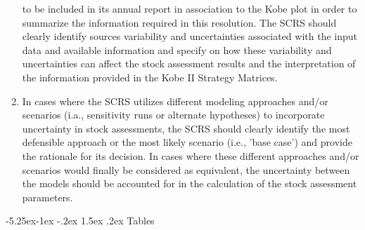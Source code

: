 \documentclass[a4paper, 10pt]{article}
\makeatletter
\renewcommand{\section}{\@startsection{section}{1}{\z@}%
  {-5.25ex\@plus -1ex \@minus -.2ex}%
  {1.5ex \@plus .2ex}%
  {\normalfont\bfseries}}
\makeatother
\begin{document}
\begin{enumerate}
        to be included in its annual report in association to the Kobe plot in order to summarize the information required 
        in this resolution.
        The SCRS should clearly identify sources variability and uncertainties associated with the input data and available 
        information and specify on how these variability and uncertainties can affect the stock assessment results and the  
        interpretation of the information provided in the Kobe II Strategy Matrices. 
  \item In cases where the SCRS utilizes different modeling approaches and/or scenarios (i.a., sensitivity runs or 
        alternate hypotheses) to incorporate uncertainty in stock assessments, the SCRS should clearly identify the most 
        defensible approach or the most likely scenario (i.e., 'base case') and provide the rationale for its decision.
        In cases where these different approaches and/or scenarios would finally be considered as equivalent, the uncertainty 
        between the models should be accounted for in the calculation of the stock assessment parameters. 
\end{enumerate}

\newpage\clearpage\section{Tables}
\end{document}
